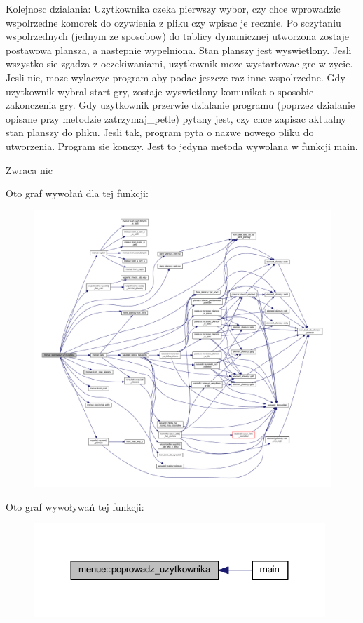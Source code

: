 Kolejnosc dzialania\+: Uzytkownika czeka pierwszy wybor, czy chce wprowadzic wspolrzedne komorek do ozywienia z pliku czy wpisac je recznie. Po sczytaniu wspolrzednych (jednym ze sposobow) do tablicy dynamicznej utworzona zostaje postawowa plansza, a nastepnie wypelniona. Stan planszy jest wyswietlony. Jesli wszystko sie zgadza z oczekiwaniami, uzytkownik moze wystartowac gre w zycie. Jesli nie, moze wylaczyc program aby podac jeszcze raz inne wspolrzedne. Gdy uzytkownik wybral start gry, zostaje wyswietlony komunikat o sposobie zakonczenia gry. Gdy uzytkownik przerwie dzialanie programu (poprzez dzialanie opisane przy metodzie zatrzymaj\+\_\+petle) pytany jest, czy chce zapisac aktualny stan planszy do pliku. Jesli tak, program pyta o nazwe nowego pliku do utworzenia. Program sie konczy. Jest to jedyna metoda wywolana w funkcji main. \begin{DoxyReturn}{Zwraca}
nic 
\end{DoxyReturn}
Oto graf wywołań dla tej funkcji\+:
\nopagebreak
\begin{figure}[H]
\begin{center}
\leavevmode
\includegraphics[width=350pt]{classmenue_aef7d47abaf00296cef8820ac538f017e_cgraph}
\end{center}
\end{figure}
Oto graf wywoływań tej funkcji\+:
\nopagebreak
\begin{figure}[H]
\begin{center}
\leavevmode
\includegraphics[width=312pt]{classmenue_aef7d47abaf00296cef8820ac538f017e_icgraph}
\end{center}
\end{figure}
\mbox{\label{classmenue_af6a59b2891dfcc8df337d3ac11fb767d}} 
